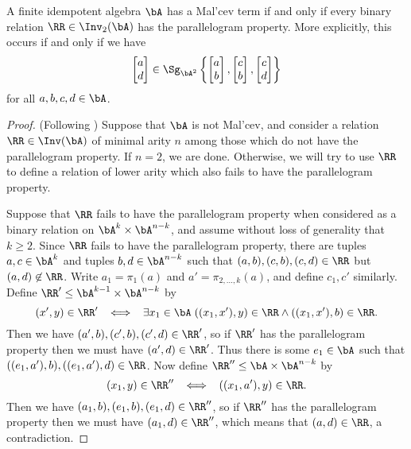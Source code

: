 \begin{thm} A finite idempotent algebra $\bA$ has a Mal'cev term if and only if every binary relation $\RR \in \Inv_2(\bA)$ has the parallelogram property. More explicitly, this occurs if and only if we have
\[
\begin{bmatrix}a\\ d\end{bmatrix} \in \Sg_{\bA^2}\left\{\begin{bmatrix}a\\ b\end{bmatrix}, \begin{bmatrix}c\\ b\end{bmatrix}, \begin{bmatrix}c\\ d\end{bmatrix}\right\}
\]
for all $a,b,c,d \in \bA$.
\end{thm}
\begin{proof} (Following \cite{zhuk-strong}) Suppose that $\bA$ is not Mal'cev, and consider a relation $\RR \in \Inv(\bA)$ of minimal arity $n$ among those which do not have the parallelogram property. If $n=2$, we are done. Otherwise, we will try to use $\RR$ to define a relation of lower arity which also fails to have the parallelogram property.

Suppose that $\RR$ fails to have the parallelogram property when considered as a binary relation on $\bA^k \times \bA^{n-k}$, and assume without loss of generality that $k \ge 2$. Since $\RR$ fails to have the parallelogram property, there are tuples $a,c \in \bA^k$ and tuples $b,d \in \bA^{n-k}$ such that $(a,b), (c,b), (c,d) \in \RR$ but $(a,d) \not\in \RR$. Write $a_1 = \pi_1(a)$ and $a' = \pi_{2, ..., k}(a)$, and define $c_1, c'$ similarly. Define $\RR' \le \bA^{k-1}\times \bA^{n-k}$ by
\[
(x',y) \in \RR' \;\; \iff \;\; \exists x_1 \in \bA \; ((x_1,x'),y) \in \RR \wedge ((x_1,x'),b) \in \RR.
\]
Then we have $(a',b), (c',b), (c',d) \in \RR'$, so if $\RR'$ has the parallelogram property then we must have $(a',d) \in \RR'$. Thus there is some $e_1 \in \bA$ such that $((e_1,a'),b), ((e_1,a'),d) \in \RR$. Now define $\RR'' \le \bA \times \bA^{n-k}$ by
\[
(x_1,y) \in \RR'' \;\; \iff \;\; ((x_1,a'),y) \in \RR.
\]
Then we have $(a_1,b), (e_1,b), (e_1,d) \in \RR''$, so if $\RR''$ has the parallelogram property then we must have $(a_1,d) \in \RR''$, which means that $(a,d) \in \RR$, a contradiction.
\end{proof}

